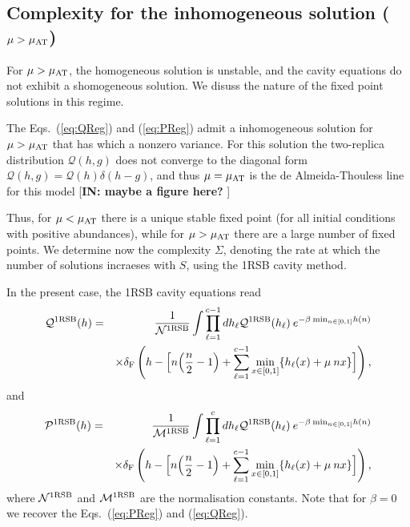 \documentclass[11pt,a4paper]{article}
\begin{document}
\subsection{Complexity for the inhomogeneous solution  ($\mu>\mu_{\rm AT}$)}  
For $\mu>\mu_{\rm AT}$, the homogeneous solution is unstable, and the cavity equations do not exhibit a shomogeneous solution.   We disuss the nature of the fixed point solutions in this regime.  

The Eqs.~(\ref{eq:QReg}) and (\ref{eq:PReg}) admit a  inhomogeneous solution for $\mu>\mu_{\rm AT}$ that has  which  a nonzero variance.    For this solution  
the  two-replica distribution $\mathcal{Q}(h,g)$  does   not converge to the diagonal form $\mathcal{Q}(h,g) = \mathcal{Q}(h)\delta(h-g)$, and  thus $\mu= \mu_{\rm AT}$   is the de Almeida-Thouless line for this model [{\bf IN: maybe a figure here? }]  


Thus, for $\mu<\mu_{\rm AT}$ there is a unique stable fixed point (for all initial conditions with positive abundances), while for  $\mu>\mu_{\rm AT}$ there are a large number of  fixed points.  
We  determine now the complexity $\Sigma$, denoting the rate at which the number of solutions incraeses with $S$,  using the 1RSB cavity method.    

In the present case, the 1RSB cavity equations read 
\begin{eqnarray}
\mathcal{Q}^{{\rm 1RSB}}(h)  & =&  \frac{1}{\mathcal{N}^{\rm 1RSB}} \int \prod^{c-1}_{\ell=1} dh_\ell \mathcal{Q}^{{\rm 1RSB}}(h_\ell) \: e^{-\beta \:  {\rm min}_{n\in [0,1]} h(n)}\nonumber\\
&& \times 
 \delta_{\rm F}\left(  h - \Big[ n\!\left(\frac{n}{2}-1\right)
      + \sum^{c-1}_{\ell=1} \min_{x\in[0,1]}\{h_\ell(x)+ \mu  \:  n x\}\Big]\right) ,
\end{eqnarray}
and 
\begin{eqnarray}
\mathcal{P}^{{\rm 1RSB}}(h)  & =&  \frac{1}{\mathcal{M}^{\rm 1RSB}} \int \prod^{c}_{\ell=1} dh_\ell \mathcal{Q}^{{\rm 1RSB}}(h_\ell) \: e^{-\beta \:  {\rm min}_{n\in [0,1]} h(n)}
\nonumber\\ 
&& \times  \delta_{\rm F}\left(  h - \Big[ n\!\left(\frac{n}{2}-1\right)
      + \sum^{c-1}_{\ell=1} \min_{x\in[0,1]}\{h_\ell(x)+ \mu  \:  n x\}\Big]\right) , 
\end{eqnarray}
where $\mathcal{N}^{\rm 1RSB}$ and $\mathcal{M}^{\rm 1RSB}$ are the normalisation constants.    Note that for $\beta=0$ we recover the Eqs.~(\ref{eq:PReg}) and (\ref{eq:QReg}).   
\end{document}
